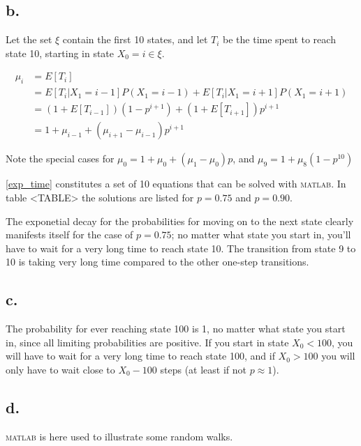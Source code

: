 \subsection*{b.}

Let the set $\xi$ contain the first 10 states, and let $T_i$ be the time spent to reach state 10, starting in state $X_0 = i \in \xi$. 


\begin{equation}
\label{exp_time}
\begin{aligned}
 \mu_i &= E[T_i] \\
       &= E[T_{i}|X_1 = i-1]P(X_1=i-1) + E[T_{i}|X_1 = i+1]P(X_1=i+1) \\
       &= ( 1+E[T_{i-1}] )( 1-p^{i+1} ) + ( 1+E[T_{i+1}] )p^{i+1} \\
       &= 1 + \mu_{i-1} + ( \mu_{i+1} - \mu_{i-1} )p^{i+1}
\end{aligned}
\end{equation}

Note the special cases for $\mu_0 = 1 + \mu_0 + (\mu_1 - \mu_0)p$, and $\mu_9 = 1 + \mu_8(1-p^{10})$

\cref{exp_time} constitutes a set of 10 equations that can be solved with \textsc{matlab}. 
In table <TABLE> the solutions are listed for $p=0.75$ and $p=0.90$.


The exponetial decay for the probabilities for moving on to the next state  clearly manifests itself for the case of $p=0.75$; no matter what state you start in, you'll have to wait for a very long time to reach state 10. The transition from state 9 to 10 is taking very long time compared to the other one-step transitions. 


\subsection*{c.}

The probability for ever reaching state 100 is 1, no matter what state you start in, since all limiting probabilities are positive. If you start in state $X_0<100$, you will have to wait for a very long time to reach state 100, and if $X_0>100$ you will only have to wait close to $X_0 - 100$ steps (at least if not $p \approx 1$).


\subsection*{d.}

\textsc{matlab} is here used to illustrate some random walks.

